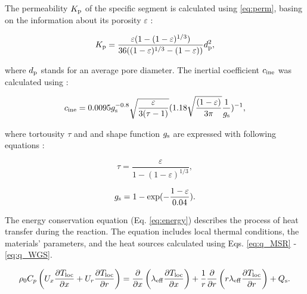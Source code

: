 \documentclass[preprint,12pt]{elsarticle}
\begin{document}
 \vspace{3mm}
 
 The permeability $K_{\rm{p}}$ of the specific segment is calculated using \eqref{eq:perm}, basing on the information about its porosity $\varepsilon$ \cite{Yang2014}:

\begin{equation}
\label{eq:perm}
K_{\rm{p}} = \frac{\varepsilon(1-(1-\varepsilon)^{1/3})}{36((1-\varepsilon)^{1/3}-(1-\varepsilon))}d_{\rm{p}}^2,
\end{equation}

\vspace{3mm}

where $d_{\rm{p}}$ stands for an average pore diameter. The inertial coefficient $c_{\rm{ine}}$ was calculated using \cite{Bhattacharya2002}:

\begin{equation}
\label{eq:inert_coef}
c_{\rm{ine}} = 0.0095g_{\rm{s}}^{-0.8}\sqrt{\frac{\varepsilon}{3(\tau-1)}}(1.18\sqrt{\frac{(1-\varepsilon)}{3\pi}}\frac{1}{g_{\rm{s}}})^{-1},
\end{equation}

\vspace{3mm}

where tortousity $\tau$ and and shape function $g_{\rm{s}}$ are expressed with following equations \cite{Yang2014, Bhattacharya2002}:

\begin{equation}
\label{eq:tortuosity}
\tau = \frac{\varepsilon}{1-(1-\varepsilon)^{1/3}},
\end{equation}

\begin{equation}
\label{eq:shape_func}
g_{\rm{s}} = 1 - \exp(-\frac{1-\varepsilon}{0.04}).
\end{equation}

\vspace{3mm}

The energy conservation equation (Eq. \eqref{eq:energy}) describes the process of heat transfer during the reaction. The equation includes local thermal conditions, the materials' parameters, and the heat sources calculated using Eqs. \eqref{eq:q_MSR} - \eqref{eq:q_WGS}. 

\begin{eqnarray} 
\label{eq:energy}
 \rho_0 C_{p} \left( U_x \frac{\partial T_{\rm{loc}}}{\partial x} + U_r \frac{\partial T_{\rm{loc}}}{\partial r} \right)  = \frac {\partial}{\partial x} \left( \lambda_{\rm{eff}}  \frac {\partial T_{\rm{loc}}}{\partial x}  \right) + \frac {1}{r} \frac {\partial}{\partial r} \left( r \lambda_{\rm{eff}}  \frac {\partial T_{\rm{loc}}}{\partial r}  \right) + Q_{\rm{s}}.
 \end{eqnarray} 
\end{document}

